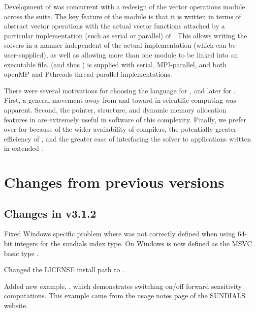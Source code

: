 Development of {\cvodes} was concurrent with a redesign of the vector
operations module across the {\sundials} suite. The key feature of the
{\nvector} module is that it is written in terms of abstract
vector operations with the actual vector functions attached by a
particular implementation (such as serial or parallel) of
{\nvector}. This allows writing the {\sundials} solvers in a manner
independent of the actual {\nvector} implementation (which can be
user-supplied), as well as allowing more than one {\nvector} module to
be linked into an executable file.
{\sundials} (and thus {\cvodes}) is supplied with serial, 
MPI-parallel, and both openMP and Pthreads thread-parallel
{\nvector} implementations.

 There were
several motivations for choosing the {\CC} language for {\cvode}, and
later for {\cvodes}.  First, a general movement away from {\F} and
toward {\CC} in scientific computing was apparent.
Second, the pointer, structure, and dynamic memory allocation features
in {\CC} are extremely useful in software of this complexity.  Finally,
we prefer {\CC} over {\CPP} for {\cvodes} because of the wider
availability of {\CC} compilers, the potentially greater efficiency of
{\CC}, and the greater ease of interfacing the solver to applications
written in extended {\F}.  

\section{Changes from previous versions}

\subsection*{Changes in v3.1.2}

Fixed Windows specific problem where  was not correctly 
defined when using 64-bit integers for the sundials index type. On Windows
 is now defined as the MSVC basic type .

Changed the LICENSE install path to .

Added new example, , which demonstrates 
switching on/off forward sensitivity computations. This example came from
the usage notes page of the SUNDIALS website.


